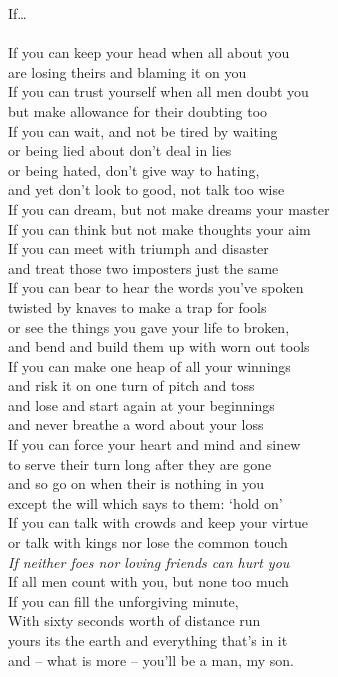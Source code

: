 \documentclass[12pt,openany]{memoir}
\begin{document}
{\Large If\ldots}\\
\\
If you can keep your head when all about you\\
are losing theirs and blaming it on you\\
If you can trust yourself when all men doubt you\\
but make allowance for their doubting too\\
If you can wait, and not be tired by waiting\\
or being lied about don't deal in lies\\
or being hated, don't give way to hating,\\
and yet don't look to good, not talk too wise\\

If you can dream, but not make dreams your master\\
If you can think but not make thoughts your aim\\
If you can meet with triumph and disaster\\
and treat those two imposters just the same\\
If you can bear to hear the words you've spoken\\
twisted by knaves to make a trap for fools\\
or see the things you gave your life to broken,\\
and bend and build them up with worn out tools\\

If you can make one heap of all your winnings\\
and risk it on one turn of pitch and toss\\
and lose and start again at your beginnings\\
and never breathe a word about your loss\\
If you can force your heart and mind and sinew\\
to serve their turn long after they are gone\\
and so go on when their is nothing in you\\
except the will which says to them: `hold on'\\

If you can talk with crowds and keep your virtue\\
or talk with kings nor lose the common touch\\
\emph{If neither foes nor loving friends can hurt you}\\
If all men count with you, but none too much\\
If you can fill the unforgiving minute,\\
With sixty seconds worth of distance run\\
yours its the earth and everything that's in it\\
and -- what is more -- you'll be a man, my son.\\
\end{document}
